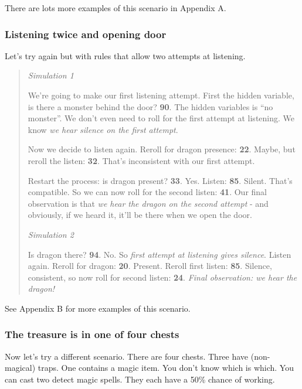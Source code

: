 \documentclass[12pt]{article}
\begin{document}
There are lots more examples of this scenario in Appendix A.

\subsubsection*{Listening twice and opening door}

Let's try again but with rules that allow two attempts at
listening.

\begin{quote}
\emph{Simulation 1}

We're going to make our first listening attempt. First the hidden
variable, is there a monster behind the door? \textbf{90}. The hidden
variables is ``no monster''. We don't even need to roll for the
first attempt at listening. We know \emph{we hear silence on the first
attempt}.

Now we decide to listen again. Reroll for dragon presence: \textbf{22}.
Maybe, but reroll the listen: \textbf{32}. That's inconsistent with
our first attempt.

Restart the process: is dragon present?
\textbf{33}. Yes. Listen: \textbf{85}. Silent. That's compatible.
So we can now roll for the second listen: \textbf{41}. Our final
observation is that \emph{we hear the dragon on the second attempt} -
and obviously, if we heard it, it'll be there when we open the door.

\hrulefill

\emph{Simulation 2}

Is dragon there? \textbf{94}. No. So \emph{first attempt at listening
gives silence}. Listen again. Reroll for dragon: \textbf{20}. Present.
Reroll first listen: \textbf{85}. Silence,
consistent, so now roll for second listen: \textbf{24}. \emph{Final
observation: we hear the dragon!}
\end{quote}

See Appendix B for more examples of this scenario.

\iffalse
\subsubsection{The treasure is in one of four chests}

Now let's try a different scenario. There are four chests. Three
have (non-magical) traps. One contains a magic item. You don't know
which is which. You can cast two detect magic spells. They each have a
50\% chance of working.
\end{document}
